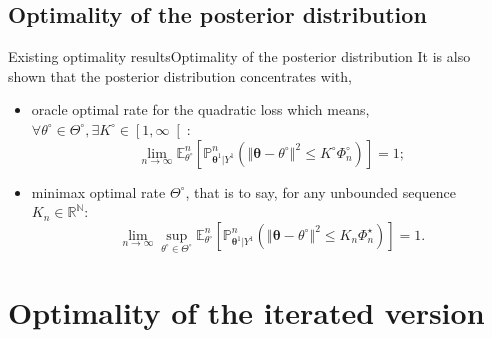 \documentclass[10pt]{beamer}
\begin{document}
\subsection{Optimality of the posterior distribution}
\begin{frame}{Existing optimality results}{Optimality of the posterior distribution}
It is also shown that the posterior distribution \textcolor{red!90!black}{concentrates with,}
	\begin{itemize}
		\item \textcolor{red!90!black}{oracle optimal rate} for the quadratic loss which means, $\forall \theta^{\circ} \in \Theta^{\circ}, \exists K^{\circ} \in \left[ 1, \infty \right[ :$
\[\lim\limits_{n \rightarrow \infty} \mathbb{E}_{\theta^{\circ}}^{n}\left[\mathbb{P}_{\boldsymbol{\theta}^{1}\vert Y^{1}}^{n}\left(\left\Vert \boldsymbol{\theta} - \theta^{\circ} \right\Vert^{2} \leq K^{\circ} \Phi_{n}^{\circ}\right)\right] = 1;\]
		\item \textcolor{red!90!black}{minimax optimal rate} $\Theta^{\circ}$, that is to say, for any unbounded sequence $K_{n} \in \mathbb{R}^{\mathbb{N}} :$
\[\lim\limits_{n \rightarrow \infty} \sup\limits_{\theta^{\circ} \in \Theta^{\circ}}  \mathbb{E}_{\theta^{\circ}}^{n}\left[\mathbb{P}_{\boldsymbol{\theta}^{1}\vert Y^{1}}^{n}\left(\left\Vert \boldsymbol{\theta} - \theta^{\circ} \right\Vert^{2} \leq K_{n} \Phi_{n}^{\star}\right)\right] = 1.\]
	\end{itemize}
\end{frame}

\section{Optimality of the iterated version}
\end{document}
